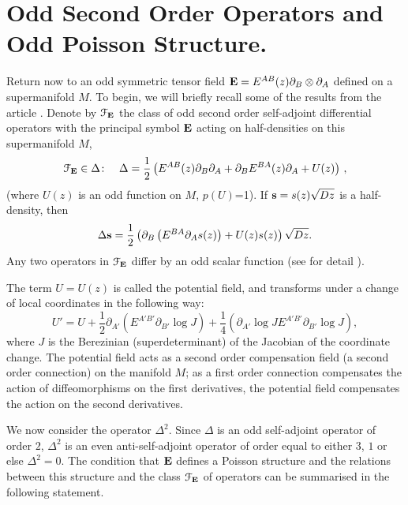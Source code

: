 \documentclass[12pt,reqno,a4paper]{amsart}
\theoremstyle{definition}
\begin{document}
\section{Odd Second Order Operators and Odd Poisson Structure.}
Return now to an odd symmetric tensor field
${{\bf E}}=E^{AB}(z){\partial}_B\otimes{\partial}_A$ defined on a supermanifold $M$. To begin, we will
 briefly recall some of the results from the article \cite{KhPed1}. Denote
  by ${{\mathcal{F}}}_{{\bf E}}$ the class of odd second order self-adjoint differential
  operators with the principal
  symbol ${{\bf E}}$ acting on half-densities on this supermanifold $M$,
    \begin{equation}\label{operatordelta}
    {{\mathcal{F}}}_{{\bf E}}\in \Delta\colon\quad
    \Delta=\frac{1}{2}\left(E^{AB}(z){\partial}_B{\partial}_A+
       {\partial}_BE^{BA}(z){\partial}_A+U(z)\right)\,,
                       \end{equation}
(where $U(z)$ is an odd function on $M$, $p(U)$=1).
  If ${{\bf s}}=s(z)\sqrt{Dz}$ is a half-density, then
                \begin{equation*}
   \Delta{{\bf s}}=\frac{1}{2}\left({\partial}_B\left(E^{BA}{\partial}_A s(z)\right)
    + U(z)s(z)\right)\sqrt{Dz}.
               \end{equation*}
Any two operators in ${{\mathcal{F}}}_{{\bf E}}$ differ
by an odd scalar function (see for detail \cite{KhPed1}).

   The term $U = U(z)$ is called the potential field, and
 transforms under a change of local
coordinates in the following way:
    \begin{equation}\label{transform}
    U' = U + \frac{1}{2}{\partial}_{A'}\left(E^{A'B'}{\partial}_{B'}\log J\right)
    + \frac{1}{4}\left({\partial}_{A'}\log JE^{A'B'}{\partial}_{B'}\log J\right),
    \end{equation}
where $J$ is the Berezinian (superdeterminant) of the Jacobian
of the coordinate change.
The potential field acts as a second order
compensation field (a second order connection) on
the manifold $M$; as a first order connection compensates the
action of diffeomorphisms on the first derivatives, the potential
field compensates the action on the second derivatives.

   We now consider
 the operator $\Delta^2$. Since $\Delta$ is an odd
 self-adjoint operator of order $2$,
  $\Delta^2$  is an even anti-self-adjoint operator of order
equal to either
 $3$, $1$ or else $\Delta^2=0$. The condition that ${{\bf E}}$ defines a
 Poisson structure and
 the relations between this structure and the class ${{\mathcal{F}}}_{{\bf E}}$
of operators can be
 summarised in the
 following statement.
\end{document}
